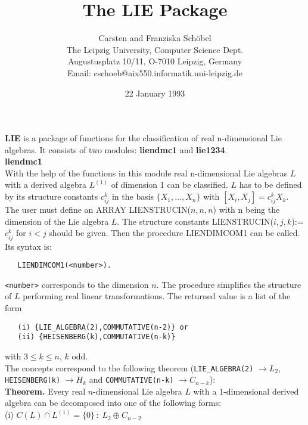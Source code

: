 \parindent0cm

\title{The {LIE} Package}
\author{Carsten and Franziska Sch\"obel\\
The Leipzig University, Computer Science Dept.\\
Augustusplatz 10/11, O-7010 Leipzig, Germany\\
Email: cschoeb@aix550.informatik.uni-leipzig.de}
\date{22 January 1993}
\maketitle
{\bf LIE} is a package of functions for the classification of real n-dimensional
Lie algebras. It consists of two modules: {\bf liendmc1} and {\bf lie1234}.
\\[0.3cm]{\large\bf liendmc1}\\[0.1cm]
With the help of the functions in this module real n-dimensional Lie algebras
$L$ with a derived algebra $L^{(1)}$ of dimension 1 can be classified. $L$ has
to be defined by its structure constants $c_{ij}^k$ in the basis
$\{X_1,\ldots,X_n\}$ with $[X_i,X_j]=c_{ij}^k X_k$. The user must define an
ARRAY LIENSTRUCIN($n,n,n$) with n being the dimension of the Lie algebra $L$.
The structure constants LIENSTRUCIN($i,j,k$):=$c_{ij}^k$ for $i<j$ should be
given. Then the procedure LIENDIMCOM1 can be called. Its syntax is:
\begin{verbatim}
   LIENDIMCOM1(<number>).
\end{verbatim}
{\tt <number>} corresponds to the dimension $n$. The procedure simplifies
the structure of $L$ performing real linear transformations. The returned
value is a list of the form
\begin{verbatim}
   (i) {LIE_ALGEBRA(2),COMMUTATIVE(n-2)} or
   (ii) {HEISENBERG(k),COMMUTATIVE(n-k)}
\end{verbatim}
with $3\leq k\leq n$, $k$ odd.\\
The concepts correspond to the following theorem ({\tt LIE\_ALGEBRA(2)}
$\rightarrow L_2$, {\tt HEISENBERG(k)} $\rightarrow H_k$ and
{\tt COMMUTATIVE(n-k)} $\rightarrow C_{n-k}$):\\[0.2cm]
{\bf Theorem.} Every real $n$-dimensional Lie algebra $L$ with a 1-dimensional
derived algebra can be decomposed into one of the following forms:\\[0.1cm]
\hspace*{0.3cm} (i) $C(L)\cap L^{(1)}=\{0\}\, :\; L_2\oplus C_{n-2}$
